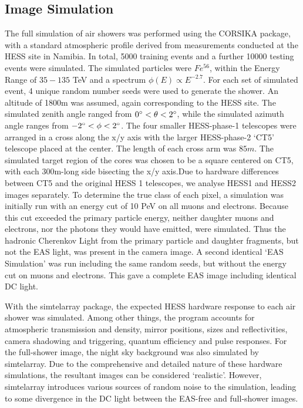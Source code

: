 \documentclass{article}
\begin{document}
\subsection{Image Simulation}
The full simulation of air showers was performed using the CORSIKA package, with a standard atmospheric profile derived from measurements conducted at the HESS site in Namibia. In total, 5000 training events and a further 10000 testing events were simulated. The simulated particles were $Fe^{56}$, within the Energy Range of $35-135$ TeV and a spectrum $\phi(E) \propto E^{-2.7}$. For each set of simulated event, 4 unique random number seeds were used to generate the shower. An altitude of 1800m was assumed, again corresponding to the HESS site. The simulated zenith angle ranged from $0\degree < \theta < 2 \degree$, while the simulated azimuth angle ranges from $-2\degree < \phi < 2 \degree$. The four smaller HESS-phase-1 telescopes were arranged in a cross along the x/y axis with the larger HESS-phase-2 \textquoteleft CT5' telescope placed at the center. The length of each cross arm was $85m$. The simulated target region of the cores was chosen to be a square centered on CT5, with each 300m-long side bisecting the x/y axis.Due to hardware differences between CT5 and the original HESS 1 telescopes, we analyse HESS1 and HESS2 images separately. To determine the true class of each pixel, a simulation was initially run with an energy cut of 10 PeV on all muons and electrons. Because this cut exceeded the primary particle energy, neither daughter muons and electrons, nor the photons they would have emitted, were simulated. Thus the hadronic Cherenkov Light from the primary particle and daughter fragments, but not the EAS light, was present in the camera image. A second identical \textquoteleft EAS Simulation' was run including the same random seeds, but without the energy cut on muons and electrons. This gave a complete EAS image including identical DC light.

With the sim\textunderscore telarray package, the expected HESS hardware response to each air shower was simulated. Among other things, the program accounts for atmospheric transmission and density, mirror positions, sizes and reflectivities, camera shadowing and triggering, quantum efficiency and pulse responses. For the full-shower image, the night sky background was also simulated by sim\textunderscore telarray. Due to the comprehensive and detailed nature of these hardware simulations, the resultant images can be considered \textquoteleft realistic'.  However, sim\textunderscore telarray introduces various sources of random noise to the simulation, leading to some divergence in the DC light between the EAS-free and full-shower images.
\end{document}
